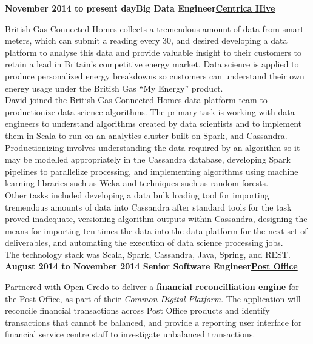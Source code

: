 \documentclass[a4paper,12pt]{article}
\newcommand{\head}[1]{\begin{center}{\large{\textbf{\sc{#1}}}}\nopagebreak\end{center}}
\newcommand{\clientwork}[3]{\textbf{#1\hfill#3\hfill#2}\nopagebreak}
\begin{document}
\head{Career History}

\clientwork{November 2014 to present day}{\href{https://www.hivehome.com}{Centrica Hive}}{Big Data Engineer}

British Gas Connected Homes collects a tremendous amount of data from smart meters, which can submit a reading every 30, and desired developing a data platform to analyse this data and provide valuable insight to their customers to retain a lead in Britain’s competitive energy market. Data science is applied to produce personalized energy breakdowns so customers can understand their own energy usage under the British Gas “My Energy” product.\\

David joined the British Gas Connected Homes data platform team to productionize data science algorithms. The primary task is working with data engineers to understand algorithms created by data scientists and to implement them in Scala to run on an analytics cluster built on Spark, and Cassandra.\\

Productionizing involves understanding the data required by an algorithm so it may be modelled appropriately in the Cassandra database, developing Spark pipelines to parallelize processing, and implementing algorithms using machine learning libraries such as Weka and techniques such as random forests.\\

Other tasks included developing a data bulk loading tool for importing tremendous amounts of data into Cassandra after standard tools for the task proved inadequate, versioning algorithm outputs within Cassandra, designing the means for importing ten times the data into the data platform for the next set of deliverables, and automating the execution of data science processing jobs.\\

The technology stack was Scala, Spark, Cassandra, Java, Spring, and REST.\\

\clientwork{August 2014 to November 2014 }{\href{http://www.postoffice.co.uk/}{Post Office}}{Senior Software Engineer}

Partnered with \href{http://www.opencredo.com/}{Open Credo} to deliver a \textbf{financial reconcilliation engine} for the Post Office, as part of their \emph{Common Digital Platform}. The application will reconcile financial transactions across Post Office products and identify transactions that cannot be balanced, and provide a reporting user interface for financial service centre staff to investigate unbalanced transactions.\\
\end{document}
